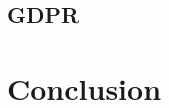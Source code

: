 \documentclass[conference]{IEEEtran}
\begin{document}
 \subsection{GDPR}

\section{Conclusion}





\end{document}
